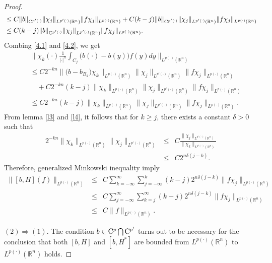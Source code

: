 \documentclass{amse-new}
\numberwithin{equation}{section} %
\begin{document}
\begin{proof}
\begin{eqnarray}
\begin{split}
&\leq C\|b\|_{{\rm C}^{p'(\cdot)}}\|\chi_{j}\|_{L^{p'(\cdot)}(\mathbb{R}^n)}\|f\chi_{j}\|_{L^{p(\cdot)}(\mathbb{R}^n)}
+C(k-j)\|b\|_{{\rm C}^{p'(\cdot)}}\|\chi_{j}\|_{L^{p'(\cdot)}(\mathbb{R}^n)}\|f\chi_{j}\|_{L^{p(\cdot)}(\mathbb{R}^n)}\\
&\leq C(k-j)\|b\|_{{\rm C}^{p'(\cdot)}}\|\chi_{j}\|_{L^{p'(\cdot)}(\mathbb{R}^n)}\|f\chi_{j}\|_{L^{p(\cdot)}(\mathbb{R}^n)}.
\end{split}
\end{eqnarray}
Combing \eqref{4.1} and \eqref{4.2}, we get
\begin{eqnarray*}
&&\Big\|\chi_{k}(\cdot)\frac{1}{|\cdot|^{n}}\int_{C_{j}}\big(b(\cdot)-b(y)\big)f(y)dy\Big\|_{L^{p(\cdot)}(\mathbb{R}^n)}\\
&&\leq C2^{-kn}\Big\|\big(b-b_{B_{k}}\big)\chi_{k}\Big\|_{L^{p(\cdot)}(\mathbb{R}^n)}\|\chi_{j}\|_{L^{p'(\cdot)}(\mathbb{R}^n)}\|f\chi_{j}\|_{L^{p(\cdot)}(\mathbb{R}^n)}\\
&&\quad+C2^{-kn}(k-j)\|\chi_{k}\|_{L^{p(\cdot)}(\mathbb{R}^n)}\|\chi_{j}\|_{L^{p'(\cdot)}(\mathbb{R}^n)}\|f\chi_{j}\|_{L^{p(\cdot)}(\mathbb{R}^n)}\\
&&\leq C2^{-kn}(k-j)\|\chi_{k}\|_{L^{p(\cdot)}(\mathbb{R}^n)}\|\chi_{j}\|_{L^{p'(\cdot)}(\mathbb{R}^n)}\|f\chi_{j}\|_{L^{p(\cdot)}(\mathbb{R}^n)}.
\end{eqnarray*}
From lemma \ref{l3} and \ref{l4}, it follows that for $k\geq j$, there exists a constant $\delta>0$ such that
\begin{eqnarray*}
2^{-kn}\|\chi_{k}\|_{L^{p(\cdot)}(\mathbb{R}^n)}\|\chi_{j}\|_{L^{p'(\cdot)}(\mathbb{R}^n)}&\leq& C\frac{\|\chi_{j}\|_{L^{p'(\cdot)}(\mathbb{R}^n)}}{\|\chi_{k}\|_{L^{p'(\cdot)}(\mathbb{R}^n)}}\\
&\leq&C2^{n\delta(j-k)}.
\end{eqnarray*}
Therefore, generalized Minkowski inequality imply
\begin{eqnarray*}
\|[b,H](f)\|_{L^{p(\cdot)}(\mathbb{R}^n)}&\leq&C\sum_{k=-\infty}^{\infty}\sum_{j=-\infty}^{k}(k-j)2^{n\delta(j-k)}\|f\chi_{j}\|_{L^{p(\cdot)}(\mathbb{R}^n)}\\
&\leq&C\sum_{j=-\infty}^{\infty}\sum_{k=j}^{\infty}(k-j)2^{n\delta(j-k)}\|f\chi_{j}\|_{L^{p(\cdot)}(\mathbb{R}^n)}\\
&\leq&C\|f\|_{L^{p(\cdot)}(\mathbb{R}^n)}.
\end{eqnarray*}

$(2)\Rightarrow (1)$. The condition $b\in {\rm C}^{p}\bigcap {\rm C}^{p'}$ turns out to be necessary for the conclusion that both $[b,H]$ and $[b,H^{*}]$ are bounded from $L^{p(\cdot)}(\mathbb{R}^n)$ to $L^{p(\cdot)}(\mathbb{R}^n)$ holds.


\end{proof}
\end{document}
